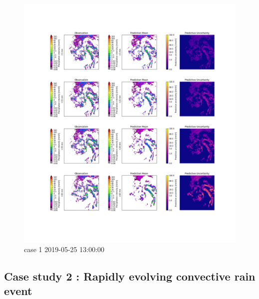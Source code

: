 \begin{figure}
	\label{fig:case1}
	\centering
	\hspace*{-3.5cm}
	\includegraphics[width=1.4\textwidth]{images/cases/2019-05-25 13:00:00_bcnn_p2_lt5_lt5_15_30_60}
	\caption{case 1 2019-05-25 13:00:00}
\end{figure}

\subsection{Case study 2 : Rapidly evolving convective rain event}

